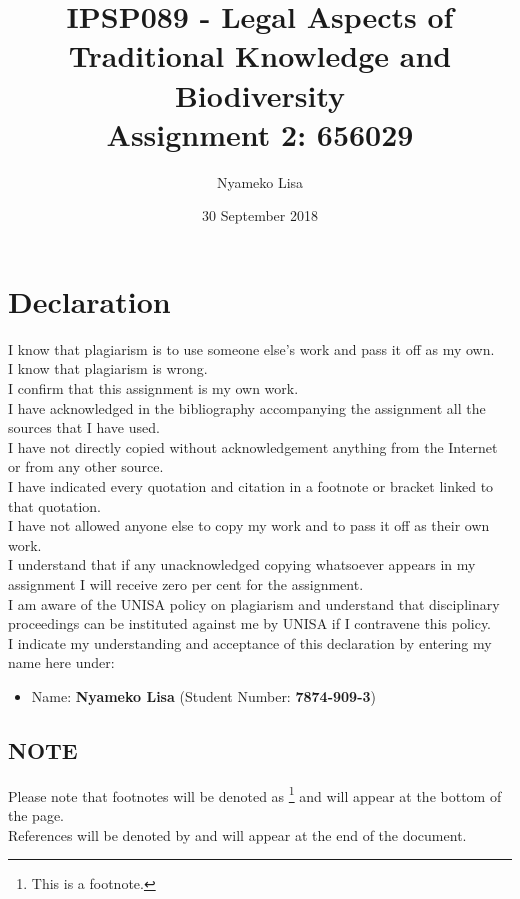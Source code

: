 \documentclass[11pt]{article}
\author{Nyameko Lisa}
\date{30 September 2018}
\title{IPSP089 - Legal Aspects of Traditional Knowledge and Biodiversity\\\medskip
\large Assignment 2: 656029}
\begin{document}
\maketitle
\addvspace{110pt}

\justifying
\addvspace{110pt}
\section*{Declaration}
\label{sec:org39253a7}
I know that plagiarism is to use someone else’s work and pass it off as my own.\\
I know that plagiarism is wrong.\\
I confirm that this assignment is my own work.\\
I have acknowledged in the bibliography accompanying the assignment all the sources that I have used.\\
I have not directly copied without acknowledgement anything from the Internet or from any other source.\\
I have indicated every quotation and citation in a footnote or bracket linked to that quotation.\\
I have not allowed anyone else to copy my work and to pass it off as their own work.\\
I understand that if any unacknowledged copying whatsoever appears in my assignment I will receive zero per cent for the assignment.\\
I am aware of the UNISA policy on plagiarism and understand that disciplinary proceedings can be instituted against me by UNISA if I contravene this policy.\\
I indicate my understanding and acceptance of this declaration by
entering my name here under:
\begin{itemize}
\item Name: \textbf{Nyameko Lisa} (Student Number: \textbf{7874-909-3})
\end{itemize}

\subsection*{NOTE}
\label{sec:org48c91fb}
Please note that footnotes will be denoted as \footnote{This is a footnote.} and will
appear at the bottom of the page.\\
References will be denoted by
\cite{wipo85_model_provi_national_laws_folklore} and will appear at the end of the document.
\newpage
\end{document}
